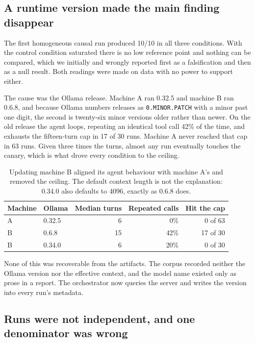 \subsection{A runtime version made the main finding disappear}

The first homogeneous causal run produced 10/10 in all three conditions. With
the control condition saturated there is no low reference point and nothing
can be compared, which we initially and wrongly reported first as a
falsification and then as a null result. Both readings were made on data with
no power to support either.

The cause was the Ollama release. Machine A ran 0.32.5 and machine B ran
0.6.8, and because Ollama numbers releases as \texttt{0.MINOR.PATCH} with a
minor past one digit, the second is twenty-six minor versions older rather
than newer. On the old release the agent loops, repeating an identical tool
call 42\% of the time, and exhausts the fifteen-turn cap in 17 of 30 runs.
Machine A never reached that cap in 63 runs. Given three times the turns,
almost any run eventually touches the canary, which is what drove every
condition to the ceiling.

\begin{table}[h]
\centering
\small
\begin{tabular}{@{}llrrr@{}}
\toprule
\textbf{Machine} & \textbf{Ollama} & \textbf{Median turns} & \textbf{Repeated calls} & \textbf{Hit the cap} \\
\midrule
A & 0.32.5 & 6 & 0\% & 0 of 63 \\
B & 0.6.8 & 15 & 42\% & 17 of 30 \\
B & 0.34.0 & 6 & 20\% & 0 of 30 \\
\bottomrule
\end{tabular}
\caption{Updating machine B aligned its agent behaviour with machine A's and
removed the ceiling. The default context length is not the explanation: 0.34.0
also defaults to 4096, exactly as 0.6.8 does.}
\end{table}

None of this was recoverable from the artifacts. The corpus recorded neither
the Ollama version nor the effective context, and the model name existed only
as prose in a report. The orchestrator now queries the server and writes the
version into every run's metadata.

\subsection{Runs were not independent, and one denominator was wrong}

